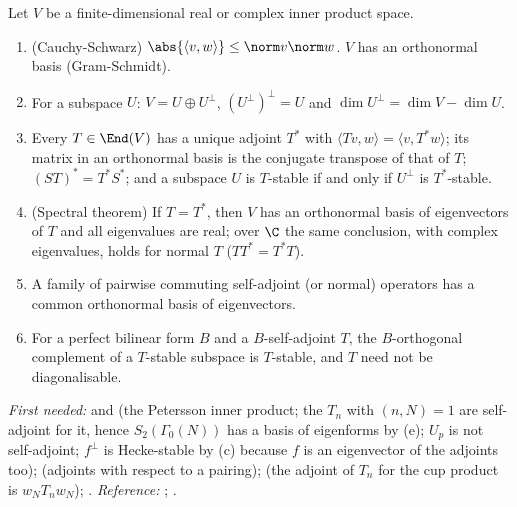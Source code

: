 \begin{theorem}\label{thm:prereq:inner}
Let $V$ be a finite-dimensional real or complex inner product space.
\begin{enumerate}[label=(\alph*)]
\item (Cauchy-Schwarz) $\abs{\langle v,w\rangle}\le\norm v\norm w$. $V$ has an orthonormal basis
(Gram-Schmidt).
\item For a subspace $U$: $V=U\oplus U^\perp$, $(U^\perp)^\perp=U$ and $\dim U^\perp=\dim V-\dim U$.
\item Every $T\in\End(V)$ has a unique adjoint $T^*$ with $\langle Tv,w\rangle=\langle v,T^*w\rangle$;
its matrix in an orthonormal basis is the conjugate transpose of that of $T$; $(ST)^*=T^*S^*$; and a
subspace $U$ is $T$-stable if and only if $U^\perp$ is $T^*$-stable.
\item (Spectral theorem) If $T=T^*$, then $V$ has an orthonormal basis of eigenvectors of $T$ and
all eigenvalues are real; over $\C$ the same conclusion, with complex eigenvalues, holds for normal
$T$ ($TT^*=T^*T$).
\item A family of pairwise commuting self-adjoint (or normal) operators has a common orthonormal
basis of eigenvectors.
\item For a perfect bilinear form $B$ and a $B$-self-adjoint $T$, the $B$-orthogonal complement of
a $T$-stable subspace is $T$-stable, and $T$ need not be diagonalisable.
\end{enumerate}
\end{theorem}
\noindent\emph{First needed:}  and  (the Petersson inner product;
the $T_n$ with $(n,N)=1$ are self-adjoint for it, hence $S_2(\Gamma_0(N))$ has a basis of eigenforms
by (e); $U_p$ is not self-adjoint; $f^\perp$ is Hecke-stable by (c) because $f$ is an eigenvector of
the adjoints too);  (adjoints with respect to a pairing);  (the
adjoint of $T_n$ for the cup product is $w_NT_nw_N$); . \emph{Reference:}
\cite[Chapters 6 and 7]{Axler15}; \cite{Halmos74}.

